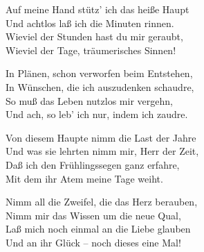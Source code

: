 \begin{liebesgedicht}
Auf meine Hand stütz' ich das heiße Haupt\\
Und achtlos laß ich die Minuten rinnen.\\
Wieviel der Stunden hast du mir geraubt,\\
Wieviel der Tage, träumerisches Sinnen!

In Plänen, schon verworfen beim Entstehen,\\
In Wünschen, die ich auszudenken schaudre,\\
So muß das Leben nutzlos mir vergehn,\\
Und ach, so leb' ich nur, indem ich zaudre.
\end{liebesgedicht}

\begin{liebesgedicht}
Von diesem Haupte nimm die Last der Jahre\\
Und was sie lehrten nimm mir, Herr der Zeit,\\
Daß ich den Frühlingssegen ganz erfahre,\\
Mit dem ihr Atem meine Tage weiht.

Nimm all die Zweifel, die das Herz berauben,\\
Nimm mir das Wissen um die neue Qual,\\
Laß mich noch einmal an die Liebe glauben\\
Und an ihr Glück – noch dieses eine Mal!
\end{liebesgedicht}

